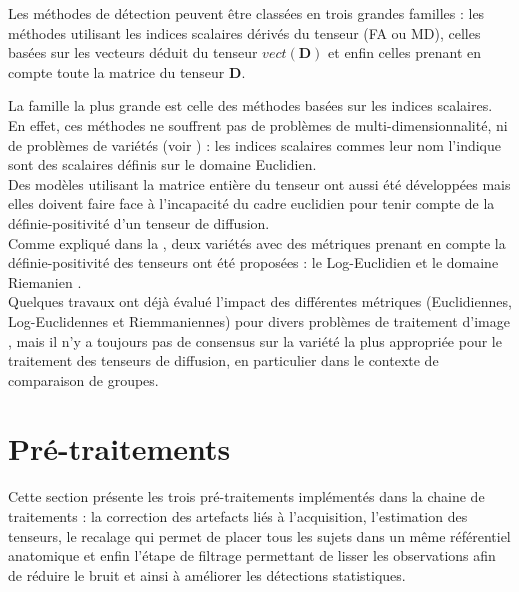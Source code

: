 Les méthodes de détection peuvent être classées en trois grandes familles : 
les méthodes utilisant les indices scalaires dérivés du tenseur (FA ou MD), 
celles basées sur les vecteurs déduit du tenseur $vect(\mathbf{D})$
et enfin celles prenant en compte toute la matrice du tenseur $\mathbf{D}$.

La famille la plus grande est celle des méthodes basées sur les indices scalaires.
En effet, ces méthodes ne souffrent pas de problèmes de multi-dimensionnalité, ni de problèmes de variétés (voir ) : 
les indices scalaires commes leur nom l'indique sont des scalaires définis sur le domaine Euclidien.\\



Des modèles utilisant la matrice entière du tenseur ont aussi été développées \cite{Zhu2009, Schwartzman2010, Yuan2012, Bouchon2014, Kim2014} 
mais elles doivent faire face à l'incapacité du cadre euclidien pour tenir compte de la définie-positivité d'un tenseur de diffusion.\\

Comme expliqué dans la , deux variétés avec des métriques prenant en compte la définie-positivité des tenseurs ont été proposées :
le Log-Euclidien \cite{Arsigny2006} et le domaine Riemanien \cite{Pennec1999}.\\

Quelques travaux ont déjà évalué l'impact des différentes métriques (Euclidiennes, Log-Euclidennes et Riemmaniennes) 
pour divers problèmes de traitement d'image \cite{Arsigny2006, Pasternak2010}, 
mais il n'y a toujours pas de consensus sur la variété la plus appropriée pour le traitement des tenseurs de diffusion, 
en particulier dans le contexte de comparaison de groupes.



\section{Pré-traitements}
\label{sec:preprocessing}
Cette section présente les trois pré-traitements implémentés dans la chaine de traitements : 
la correction des artefacts liés à l'acquisition,  l'estimation des tenseurs, le recalage qui permet de placer tous les sujets dans un même référentiel anatomique 
et enfin l'étape de filtrage permettant de lisser les observations afin de réduire le bruit et ainsi à améliorer les détections statistiques.

